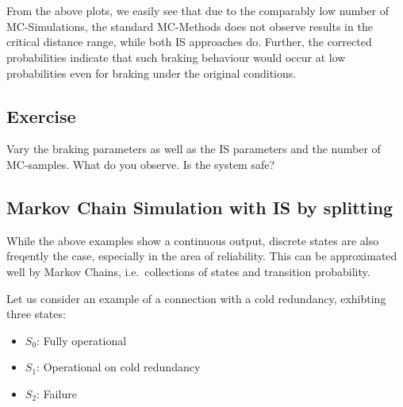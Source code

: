 \documentclass[11pt,a4paper, d]{scrartcl}
\providecommand{\tightlist}{%
      \setlength{\itemsep}{0pt}\setlength{\parskip}{0pt}}
\begin{document}
    \begin{center}
    \end{center}
    { \hspace*{\fill} \\}
    
    \begin{center}
    \end{center}
    { \hspace*{\fill} \\}
    
    From the above plots, we easily see that due to the comparably low
number of MC-Simulations, the standard MC-Methods does not observe
results in the critical distance range, while both IS approaches do.
Further, the corrected probabilities indicate that such braking
behaviour would occur at low probabilities even for braking under the
original conditions.

    \hypertarget{exercise}{%
\subsection{Exercise}\label{exercise}}

Vary the braking parameters as well as the IS parameters and the number
of MC-samples. What do you observe. Is the system safe?

    \hypertarget{markov-chain-simulation-with-is-by-splitting}{%
\subsection{Markov Chain Simulation with IS by
splitting}\label{markov-chain-simulation-with-is-by-splitting}}

While the above examples show a continuous output, discrete states are
also freqently the case, especially in the area of reliability. This can
be approximated well by Markov Chains, i.e.~collections of states and
transition probability.

Let us consider an example of a connection with a cold redundancy,
exhibting three states:

\begin{itemize}
\tightlist
\item
  \(S_0\): Fully operational
\item
  \(S_1\): Operational on cold redundancy
\item
  \(S_2\): Failure
\end{itemize}
\end{document}
